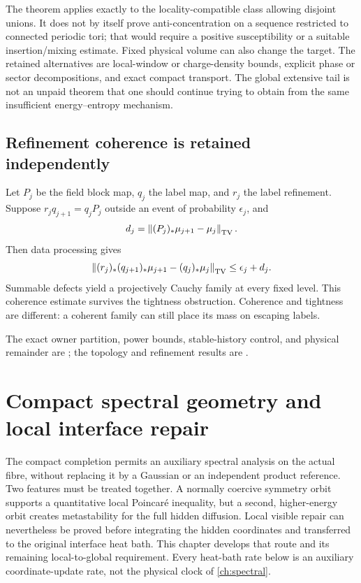 \documentclass[11pt,oneside,openany]{book}
\theoremstyle{definition}
\theoremstyle{remark}
\newcommand{\norm}[1]{\left\lVert#1\right\rVert}
\newcommand{\src}[2]{\cite[#2]{#1}}
\newcommand{\sourcebasis}[1]{\par\smallskip\noindent #1\par}
\begin{document}
The theorem applies exactly to the locality-compatible class allowing disjoint unions. It does not by itself prove anti-concentration on a sequence restricted to connected periodic tori; that would require a positive susceptibility or a suitable insertion/mixing estimate. Fixed physical volume can also change the target. The retained alternatives are local-window or charge-density bounds, explicit phase or sector decompositions, and exact compact transport. The global extensive tail is not an unpaid theorem that one should continue trying to obtain from the same insufficient energy--entropy mechanism.

\section{Refinement coherence is retained independently}
Let $P_j$ be the field block map, $q_j$ the label map, and $r_j$ the label refinement. Suppose $r_jq_{j+1}=q_jP_j$ outside an event of probability $\epsilon_j$, and
\[
d_j=\norm{(P_j)_*\mu_{j+1}-\mu_j}_{\rm TV}.
\]
Then data processing gives
\begin{equation}\label{eq:label-TV}
\norm{(r_j)_*(q_{j+1})_*\mu_{j+1}-(q_j)_*\mu_j}_{\rm TV}
\le\epsilon_j+d_j.
\end{equation}
Summable defects yield a projectively Cauchy family at every fixed level. This coherence estimate survives the tightness obstruction. Coherence and tightness are different: a coherent family can still place its mass on escaping labels. \src{PAR}{V5}
\sourcebasis{The exact owner partition, power bounds, stable-history control, and physical remainder are \src{PAR}{V1--V4}; the topology and refinement results are \src{PAR}{V5}.}

\chapter{Compact spectral geometry and local interface repair}
\label{ch:compact-repair}
The compact completion permits an auxiliary spectral analysis on the
actual fibre, without replacing it by a Gaussian or an independent
product reference. Two features must be treated together. A normally
coercive symmetry orbit supports a quantitative local Poincar\'e
inequality, but a second, higher-energy orbit creates metastability
for the full hidden diffusion. Local visible repair can nevertheless
be proved before integrating the hidden coordinates and transferred
to the original interface heat bath. This chapter develops that route
and its remaining local-to-global requirement. Every heat-bath rate
below is an auxiliary coordinate-update rate, not the physical clock
of \cref{ch:spectral}.
\end{document}
